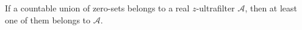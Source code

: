 If a countable union of zero-sets belongs to a real $z$-ultrafilter $\mathcal{A}$, then at least one of them belongs to $\mathcal{A}$.
